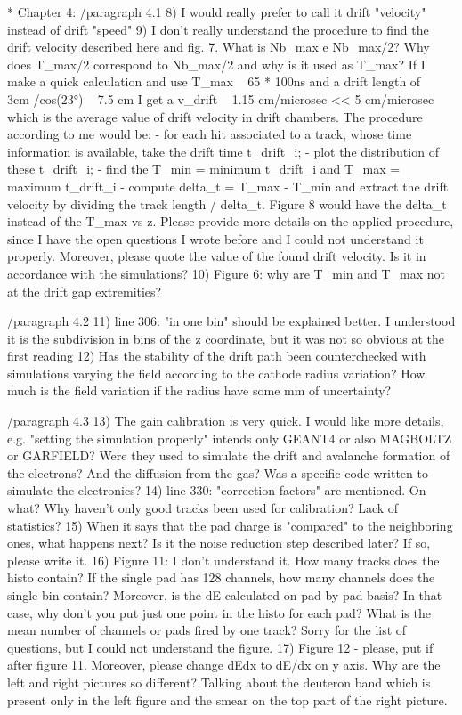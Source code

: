 \documentclass[a4paper,11pt,twoside]{article}
\begin{document}
* Chapter 4:
	/paragraph 4.1
8)	I would really prefer to call it drift "velocity" instead of drift "speed"
9)	I don't really understand the procedure to find the drift velocity described here and fig. 7. What is Nb_max e Nb_max/2? Why does T_max/2 correspond to Nb_max/2 and why is it used as T_max? If I make a quick calculation and use T_max ~ 65 * 100ns and a drift length of ~ 3cm /cos(23°) ~ 7.5 cm I get a v_drift ~ 1.15 cm/microsec << 5 cm/microsec which is the average value of drift velocity in drift chambers.
The procedure according to me would be:
- for each hit associated to a track, whose time information is available, take the drift time t_drift_i;
- plot the distribution of these t_drift_i;
- find the T_min = minimum t_drift_i and T_max = maximum t_drift_i
- compute delta_t = T_max - T_min and extract the drift velocity by dividing the track length / delta_t. Figure 8 would have the delta_t instead of the T_max vs z.
Please provide more details on the applied procedure, since I have the open questions I wrote before and I could not understand it properly. Moreover, please quote the value of the found drift velocity. Is it in accordance with the simulations?
10)	Figure 6: why are T_min and T_max not at the drift gap extremities?

        /paragraph 4.2
11)	line 306: "in one bin" should be explained better. I understood it is the subdivision in bins of the z coordinate, but it was not so obvious at the first reading
12)	Has the stability of the drift path been counterchecked with simulations varying the field according to the cathode radius variation? How much is the field variation if the radius have some mm of uncertainty?

        /paragraph 4.3
13)	The gain calibration is very quick. I would like more details, e.g. "setting the simulation properly" intends only GEANT4 or also MAGBOLTZ or GARFIELD? Were they used to simulate the drift and avalanche formation of the electrons? And the diffusion from the gas? Was a specific code written to simulate the electronics?
14)	line 330: "correction factors" are mentioned. On what? Why haven't only good tracks been used for calibration? Lack of statistics?
15)	When it says that the pad charge is "compared" to the neighboring ones, what happens next? Is it the noise reduction step described later? If so, please write it. 
16)	Figure 11: I don't understand it. How many tracks does the histo contain? If the single pad has 128 channels, how many channels does the single bin contain? Moreover, is the dE calculated on pad by pad basis? In that case, why don't you put just one point in the histo for each pad? What is the mean number of channels or pads fired by one track? Sorry for the list of questions, but I could not understand the figure.
17)	Figure 12 - please, put if after figure 11. Moreover, please change dEdx to dE/dx on y axis. Why are the left and right pictures so different? Talking about the deuteron band which is present only in the left figure and the smear on the top part of the right picture. 
\end{document}
